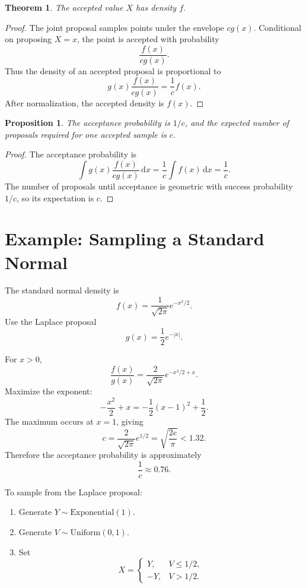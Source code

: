 \documentclass[12pt,oneside]{book}
\numberwithin{equation}{section}
\theoremstyle{definition}
\theoremstyle{plain}
\newtheorem{theorem}{Theorem}[section]
\newtheorem{proposition}{Proposition}[section]
\theoremstyle{remark}
\newcommand{\dd}{\,\mathrm{d}}
\newcommand{\Exp}{\mathrm{Exponential}}
\begin{document}
\begin{theorem}
The accepted value $X$ has density $f$.
\end{theorem}

\begin{proof}
The joint proposal samples points under the envelope $c g(x)$. Conditional on proposing $X=x$, the point is accepted with probability
\[
\frac{f(x)}{c g(x)}.
\]
Thus the density of an accepted proposal is proportional to
\[
g(x)\frac{f(x)}{c g(x)}
=
\frac{1}{c}f(x).
\]
After normalization, the accepted density is $f(x)$.
\end{proof}

\begin{proposition}
The acceptance probability is $1/c$, and the expected number of proposals required for one accepted sample is $c$.
\end{proposition}

\begin{proof}
The acceptance probability is
\[
\int g(x)\frac{f(x)}{c g(x)}\dd x
=
\frac{1}{c}\int f(x)\dd x
=
\frac{1}{c}.
\]
The number of proposals until acceptance is geometric with success probability $1/c$, so its expectation is $c$.
\end{proof}

\section{Example: Sampling a Standard Normal}

The standard normal density is
\[
f(x)=\frac{1}{\sqrt{2\pi}}e^{-x^2/2}.
\]
Use the Laplace proposal
\[
g(x)=\frac{1}{2}e^{-|x|}.
\]

For $x>0$,
\[
\frac{f(x)}{g(x)}
=
\frac{2}{\sqrt{2\pi}}e^{-x^2/2+x}.
\]
Maximize the exponent:
\[
-\frac{x^2}{2}+x
=
-\frac{1}{2}(x-1)^2+\frac{1}{2}.
\]
The maximum occurs at $x=1$, giving
\[
c
=
\frac{2}{\sqrt{2\pi}}e^{1/2}
=
\sqrt{\frac{2e}{\pi}}
<1.32.
\]
Therefore the acceptance probability is approximately
\[
\frac{1}{c}\approx 0.76.
\]

To sample from the Laplace proposal:
\begin{enumerate}
\item Generate $Y\sim \Exp(1)$.
\item Generate $V\sim \mathrm{Uniform}(0,1)$.
\item Set
\[
X=
\begin{cases}
Y, & V\le 1/2,\\
-Y, & V>1/2.
\end{cases}
\]
\end{enumerate}
\end{document}
